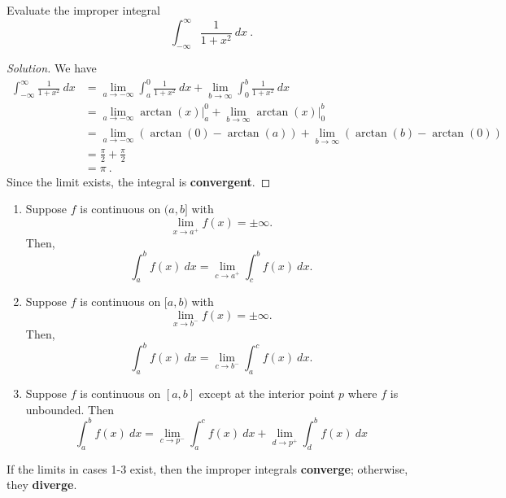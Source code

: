 \documentclass[compacto,10pt,comentarios]{aleph-notas}
\begin{document}
\begin{ejer}
    Evaluate the improper integral
    $$
        \int_{-\infty}^{\infty} \frac{1}{1 + x^{2}} ~ dx ~ .
    $$
\end{ejer}
\begin{proof}[Solution]
    We have
    \begin{align*}
        \int_{-\infty}^{\infty} \frac{1}{1 + x^{2}} ~ dx
            & = \lim_{a \to -\infty} \int_{a}^{0} \frac{1}{1 + x^{2}} ~ dx 
                + \lim_{b \to \infty} \int_{0}^{b} \frac{1}{1 + x^{2}} ~ dx  \\
            & = \lim_{a \to -\infty} \left. \arctan(x) \right\rvert_{a}^{0}
                + \lim_{b \to \infty} \left. \arctan(x) \right\rvert_{0}^{b} \\
            & = \lim_{a \to -\infty} \left( \arctan(0) - \arctan(a) \right)
                + \lim_{b \to \infty} \left( \arctan(b) - \arctan(0) \right) \\
            & = \frac{\pi}{2} + \frac{\pi}{2} \\
            & = \pi ~ .
    \end{align*}
    Since the limit exists, the integral is \textbf{convergent}.
\end{proof}

\begin{teo}
    \begin{enumerate}
        \item Suppose $f$ is continuous on $(a, b]$ with
        $$
            \lim_{x \to a^{+}} f(x) = \pm \infty.
        $$
        Then,
        $$
            \int_{a}^{b} f(x) ~ dx = \lim_{c \to a^{+}} \int_{c}^{b} f(x) ~ dx .
        $$
        \item Suppose $f$ is continuous on $[a, b)$ with
        $$
            \lim_{x \to b^{-}} f(x) = \pm \infty.
        $$
        Then,
        $$
            \int_{a}^{b} f(x) ~ dx = \lim_{c \to b^{-}} \int_{a}^{c} f(x) ~ dx .
        $$
        \item Suppose $f$ is continuous on $[a, b]$ except at the interior point $p$ where $f$ is unbounded. Then
        $$
            \int_{a}^{b} f(x) ~ dx = \lim_{c \to p^{-}} \int_{a}^{c} f(x) ~ dx 
                + \lim_{d \to p^{+}} \int_{d}^{b} f(x) ~ dx 
        $$
    \end{enumerate}
    If the limits in cases 1-3 exist, then the improper integrals \textbf{converge}; otherwise, they \textbf{diverge}.
\end{teo}
\end{document}
